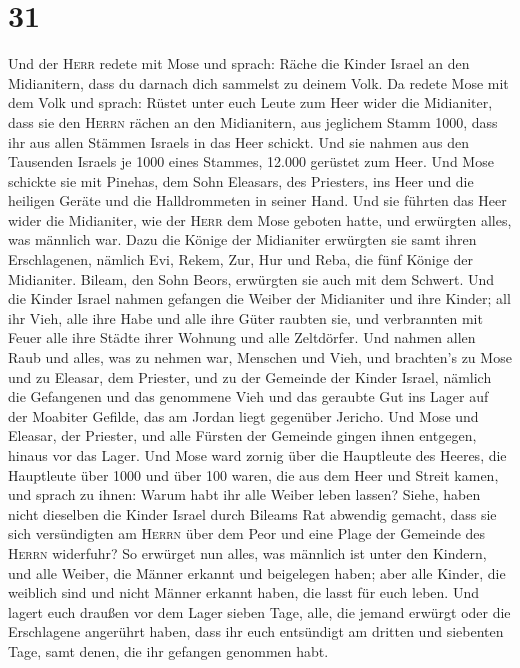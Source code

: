 \hypertarget{section-30}{%
\section{31}\label{section-30}}

 Und der \textsc{Herr} redete mit Mose und sprach:
 Räche die Kinder Israel an den Midianitern, dass du
darnach dich sammelst zu deinem Volk.  Da redete Mose mit
dem Volk und sprach: Rüstet unter euch Leute zum Heer wider die
Midianiter, dass sie den \textsc{Herrn} rächen an den Midianitern,
 aus jeglichem Stamm 1000, dass ihr aus allen Stämmen
Israels in das Heer schickt.  Und sie nahmen aus den
Tausenden Israels je 1000 eines Stammes, 12.000 gerüstet zum Heer.
 Und Mose schickte sie mit Pinehas, dem Sohn Eleasars, des
Priesters, ins Heer und die heiligen Geräte und die Halldrommeten in
seiner Hand.  Und sie führten das Heer wider die
Midianiter, wie der \textsc{Herr} dem Mose geboten hatte, und erwürgten
alles, was männlich war.  Dazu die Könige der Midianiter
erwürgten sie samt ihren Erschlagenen, nämlich Evi, Rekem, Zur, Hur und
Reba, die fünf Könige der Midianiter. Bileam, den Sohn Beors, erwürgten
sie auch mit dem Schwert.  Und die Kinder Israel nahmen
gefangen die Weiber der Midianiter und ihre Kinder; all ihr Vieh, alle
ihre Habe und alle ihre Güter raubten sie,  und
verbrannten mit Feuer alle ihre Städte ihrer Wohnung und alle
Zeltdörfer.  Und nahmen allen Raub und alles, was zu
nehmen war, Menschen und Vieh,  und brachten's zu Mose
und zu Eleasar, dem Priester, und zu der Gemeinde der Kinder Israel,
nämlich die Gefangenen und das genommene Vieh und das geraubte Gut ins
Lager auf der Moabiter Gefilde, das am Jordan liegt gegenüber Jericho.
 Und Mose und Eleasar, der Priester, und alle Fürsten der
Gemeinde gingen ihnen entgegen, hinaus vor das Lager. 
Und Mose ward zornig über die Hauptleute des Heeres, die Hauptleute über
1000 und über 100 waren, die aus dem Heer und Streit kamen,
 und sprach zu ihnen: Warum habt ihr alle Weiber leben
lassen?  Siehe, haben nicht dieselben die Kinder Israel
durch Bileams Rat abwendig gemacht, dass sie sich versündigten am
\textsc{Herrn} über dem Peor und eine Plage der Gemeinde des
\textsc{Herrn} widerfuhr?  So erwürget nun alles, was
männlich ist unter den Kindern, und alle Weiber, die Männer erkannt und
beigelegen haben;  aber alle Kinder, die weiblich sind
und nicht Männer erkannt haben, die lasst für euch leben.
 Und lagert euch draußen vor dem Lager sieben Tage, alle,
die jemand erwürgt oder die Erschlagene angerührt haben, dass ihr euch
entsündigt am dritten und siebenten Tage, samt denen, die ihr gefangen
genommen habt.

